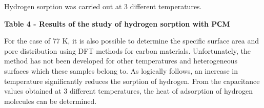 Hydrogen sorption was carried out at 3 different temperatures.

{\bfseries Table 4 - Results of the study of hydrogen sorption with PСM}


For the case of 77 K, it is also possible to determine the specific
surface area and pore distribution using DFT methods for carbon
materials. Unfortunately, the method has not been developed for other
temperatures and heterogeneous surfaces which these samples belong to.
As logically follows, an increase in temperature significantly reduces
the sorption of hydrogen. From the capacitance values
\hspace{0pt}\hspace{0pt}obtained at 3 different temperatures, the heat
of adsorption of hydrogen molecules can be determined.

